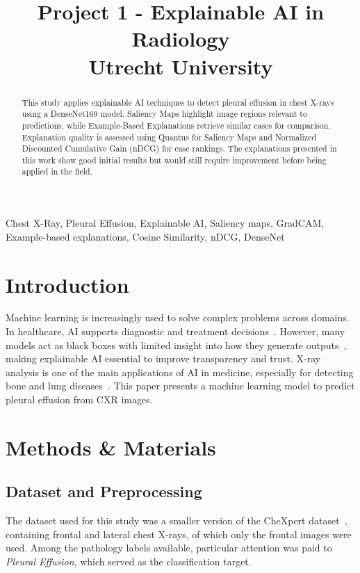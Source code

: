 \documentclass[9pt]{midl} %
\title[Explainable AI in Radiology]{Project 1 - Explainable AI in Radiology \\ \small Utrecht University}
\begin{document}
\maketitle
\vspace{-0.6cm}
\begin{abstract}
This study applies explainable AI techniques to detect pleural effusion in chest X-rays using a DenseNet169 model.
Saliency Maps highlight image regions relevant to predictions, while Example-Based Explanations retrieve similar cases for comparison. Explanation quality is assessed using Quantus for Saliency Maps and Normalized Discounted Cumulative Gain (nDCG) for case rankings. The explanations presented in this work show good initial results but would still require improvement before being applied in the field.
\end{abstract}

\begin{keywords}
Chest X-Ray, Pleural Effusion, Explainable AI, Saliency maps, GradCAM, Example-based explanations, Cosine Similarity, nDCG, DenseNet
\end{keywords}

\section{Introduction}\label{sec:introduction}
Machine learning is increasingly used to solve complex problems across domains.
In healthcare, AI supports diagnostic and treatment decisions~\cite{e2024evaluating}.
However, many models act as black boxes with limited insight into how they generate outputs~\cite{ahmed2022explainable}, making explainable AI essential to improve transparency and trust.
X-ray analysis is one of the main applications of AI in medicine, especially for detecting bone and lung diseases~\cite{miro2022evaluating}.
This paper presents a machine learning model to predict pleural effusion from CXR images.

\section{Methods \& Materials}\label{sec:methods-materials}
\subsection*{Dataset and Preprocessing}

The dataset used for this study was a smaller version of the CheXpert dataset~\cite{ashery_chexpert}, containing frontal and lateral chest X-rays, of which only the frontal images were used.
Among the pathology labels available, particular attention was paid to \emph{Pleural Effusion}, which served as the classification target.
\end{document}
